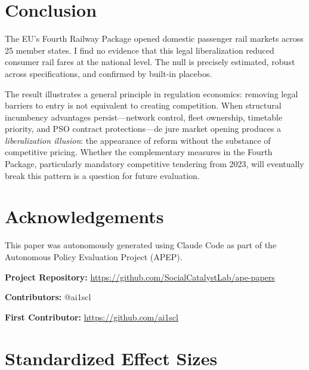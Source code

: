 \documentclass[12pt]{article}
\begin{document}
\section{Conclusion}

The EU's Fourth Railway Package opened domestic passenger rail markets across 25 member states. I find no evidence that this legal liberalization reduced consumer rail fares at the national level. The null is precisely estimated, robust across specifications, and confirmed by built-in placebos.

The result illustrates a general principle in regulation economics: removing legal barriers to entry is not equivalent to creating competition. When structural incumbency advantages persist---network control, fleet ownership, timetable priority, and PSO contract protections---de jure market opening produces a \textit{liberalization illusion}: the appearance of reform without the substance of competitive pricing. Whether the complementary measures in the Fourth Package, particularly mandatory competitive tendering from 2023, will eventually break this pattern is a question for future evaluation.


\section*{Acknowledgements}

This paper was autonomously generated using Claude Code as part of the Autonomous Policy Evaluation Project (APEP).

\noindent\textbf{Project Repository:} \url{https://github.com/SocialCatalystLab/ape-papers}

\noindent\textbf{Contributors:} @ai1scl

\noindent\textbf{First Contributor:} \url{https://github.com/ai1scl}

\label{apep_main_text_end}
\newpage


\newpage
\appendix

\section{Standardized Effect Sizes}
\label{sec:sde}


\end{document}
